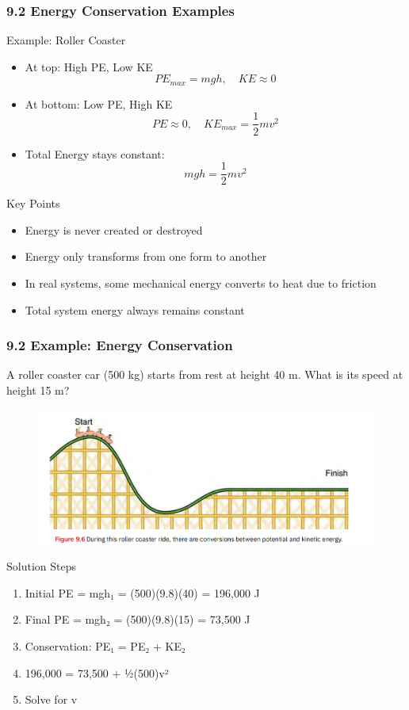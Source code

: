 \documentclass{beamer}
\begin{document}
\begin{frame}
\frametitle{9.2 Energy Conservation Examples}
\begin{block}{Example: Roller Coaster}
\begin{itemize}
\item At top: High PE, Low KE
 $$PE_{max} = mgh, \quad KE \approx 0$$
\item At bottom: Low PE, High KE
 $$PE \approx 0, \quad KE_{max} = \frac{1}{2}mv^2$$
\item Total Energy stays constant:
 $$mgh = \frac{1}{2}mv^2$$
\end{itemize}
\end{block}
\end{frame}

\begin{frame}
\begin{exampleblock}{Key Points}
\begin{itemize}
\item Energy is never created or destroyed
\item Energy only transforms from one form to another
\item In real systems, some mechanical energy converts to heat due to friction
\item Total system energy always remains constant
\end{itemize}
\end{exampleblock}
\end{frame}

\begin{frame}
\frametitle{9.2 Example: Energy Conservation}
A roller coaster car (500 kg) starts from rest at height 40 m. What is its speed at height 15 m?
\begin{figure}
    \centering
    \includegraphics[width=0.5\linewidth]{coaster.png}
\end{figure}

\end{frame}


\begin{frame}
\begin{block}{Solution Steps}
\begin{enumerate}
\item Initial PE = mgh₁ = (500)(9.8)(40) = 196,000 J
\item Final PE = mgh₂ = (500)(9.8)(15) = 73,500 J
\item Conservation: PE₁ = PE₂ + KE₂
\item 196,000 = 73,500 + ½(500)v²
\item Solve for v
\end{enumerate}
\end{block}
\end{frame}
\end{document}
